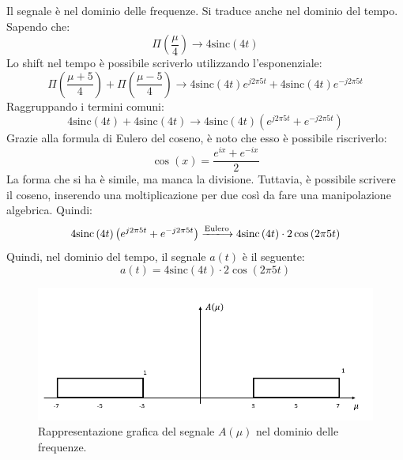 \documentclass[a4paper]{article}
\begin{document}
	\noindent
	Il segnale è nel dominio delle frequenze. Si traduce anche nel dominio del tempo. Sapendo che:
	\begin{equation*}
		\Pi\left(\dfrac{\mu}{4}\right) \longrightarrow 4\mathrm{sinc}\left(4t\right)
	\end{equation*}
	Lo shift nel tempo è possibile scriverlo utilizzando l'esponenziale:
	\begin{equation*}
		\Pi\left(\dfrac{\mu + 5}{4}\right) + \Pi\left(\dfrac{\mu - 5}{4}\right) \longrightarrow 4\mathrm{sinc}\left(4t\right) e^{j 2 \pi 5 t} + 4\mathrm{sinc}\left(4t\right) e^{-j 2 \pi 5 t}
	\end{equation*}
	Raggruppando i termini comuni:
	\begin{equation*}
		4\mathrm{sinc}\left(4t\right) + 4\mathrm{sinc}\left(4t\right) \longrightarrow 4\mathrm{sinc}\left(4t\right)\left(e^{j 2 \pi 5 t} + e^{-j 2 \pi 5 t}\right)
	\end{equation*}
	Grazie alla formula di Eulero del coseno, è noto che esso è possibile riscriverlo:
	\begin{equation*}
		\cos\left(x\right) = \dfrac{e^{ix} + e^{-ix}}{2}
	\end{equation*}
	La forma che si ha è simile, ma manca la divisione. Tuttavia, è possibile scrivere il coseno, inserendo una moltiplicazione per due così da fare una manipolazione algebrica. Quindi:
	\begin{equation*}
		4\mathrm{sinc}\left(4t\right)\left(e^{j 2 \pi 5 t} + e^{-j 2 \pi 5 t}\right) \xlongrightarrow{\text{Eulero}} 4\mathrm{sinc}\left(4t\right) \cdot 2 \cos\left(2 \pi 5 t\right)
	\end{equation*}
	Quindi, nel dominio del tempo, il segnale $a\left(t\right)$ è il seguente:
	\begin{equation*}
		a\left(t\right) = 4\mathrm{sinc}\left(4t\right) \cdot 2 \cos\left(2 \pi 5 t\right)
	\end{equation*}
	\begin{figure}[!htp]
		\centering
		\includegraphics[width=\textwidth]{img/fig_1.png}
		\caption*{Rappresentazione grafica del segnale $A\left(\mu\right)$ nel dominio delle frequenze.}
	\end{figure}\newpage
	
\end{document}
